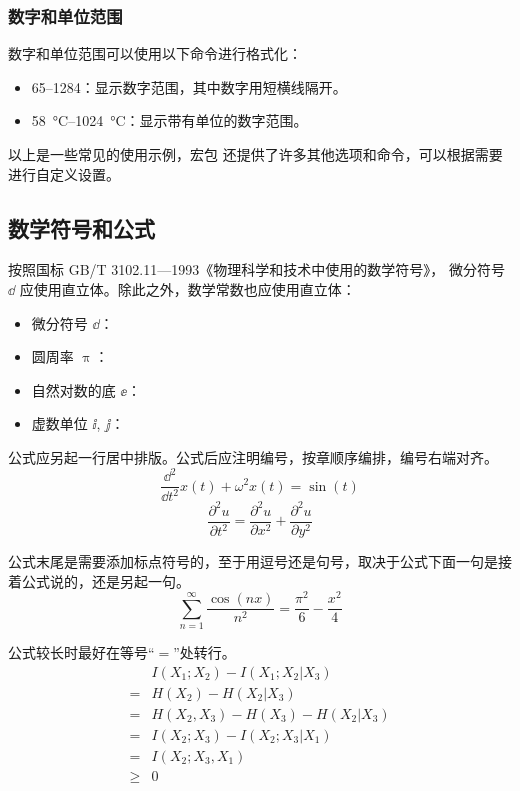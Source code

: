 \subsubsection*{数字和单位范围}

数字和单位范围可以使用以下命令进行格式化：

\begin{itemize}
  \item \numrange{65}{1284}：显示数字范围，其中数字用短横线隔开。
  \item \SIrange{58}{1024}{\degreeCelsius}：显示带有单位的数字范围。
\end{itemize}

以上是一些常见的使用示例，宏包  还提供了许多其他选项和命令，可以根据需要进行自定义设置。

\subsection{数学符号和公式}

按照国标 GB/T 3102.11—1993《物理科学和技术中使用的数学符号》，
微分符号 $\dd$ 应使用直立体。除此之外，数学常数也应使用直立体：
\begin{itemize}
  \item 微分符号 $\dd$：
  \item 圆周率 $\uppi$：
  \item 自然对数的底 $\ee$：
  \item 虚数单位 $\ii$, $\jj$： 
\end{itemize}

公式应另起一行居中排版。公式后应注明编号，按章顺序编排，编号右端对齐。
\begin{equation}
  \frac{\dd^2}{\dd t^2}x(t)+\omega^2x(t)=\sin(t)
\end{equation}
\begin{equation}
  \frac{\partial^2u}{\partial t^2}=\frac{\partial^2u}{\partial x^2}+\frac{\partial^2u}{\partial y^2}
\end{equation}

公式末尾是需要添加标点符号的，至于用逗号还是句号，取决于公式下面一句是接着公式说的，还是另起一句。
\begin{equation}
  \sum_{n=1}^{\infty}\frac{\cos(nx)}{n^2}=\frac{\pi^2}{6}-\frac{x^2}{4}
\end{equation}

公式较长时最好在等号“$=$”处转行。
\begin{align}
       & I(X_1;X_2)-I(X_1;X_2|X_3) \nonumber    \\
  =    & H(X_2)-H(X_2|X_3) \nonumber            \\
  =    & H(X_2,X_3)-H(X_3)-H(X_2|X_3) \nonumber \\
  =    & I(X_2;X_3)-I(X_2;X_3|X_1) \nonumber    \\
  =    & I(X_2;X_3,X_1) \nonumber               \\
  \geq & 0                                      
\end{align}

